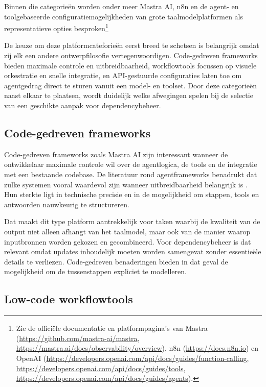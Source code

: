 Binnen die categorieën worden onder meer Mastra AI, n8n en de agent- en toolgebaseerde configuratiemogelijkheden van grote taalmodelplatformen als representatieve opties besproken\footnote{Zie de officiële documentatie en platformpagina's van Mastra (\url{https://github.com/mastra-ai/mastra}, \url{https://mastra.ai/docs/observability/overview}), n8n (\url{https://docs.n8n.io}) en OpenAI (\url{https://developers.openai.com/api/docs/guides/function-calling}, \url{https://developers.openai.com/api/docs/guides/tools}, \url{https://developers.openai.com/api/docs/guides/agents}).}

De keuze om deze platformcateforieën eerst breed te schetsen is belangrijk omdat zij elk een andere ontwerpfilosofie vertegenwoordigen. Code-gedreven frameworks bieden maximale controle en uitbreidbaarheid, workflowtools focussen op visuele orkestratie en snelle integratie, en API-gestuurde configuraties laten toe om agentgedrag direct te sturen vanuit een model- en toolset. Door deze categorieën naast elkaar te plaatsen, wordt duidelijk welke afwegingen spelen bij de selectie van een geschikte aanpak voor dependencybeheer.

\subsection{Code-gedreven frameworks}

Code-gedreven frameworks zoals Mastra AI zijn interessant wanneer de ontwikkelaar maximale controle wil over de agentlogica, de tools en de integratie met een bestaande codebase. De literatuur rond agentframeworks benadrukt dat zulke systemen vooral waardevol zijn wanneer uitbreidbaarheid belangrijk is \textcite{MastraGithub,MastraTutorial,MastraObservability}. Hun sterkte ligt in technische precisie en in de mogelijkheid om stappen, tools en antwoorden nauwkeurig te structureren.

Dat maakt dit type platform aantrekkelijk voor taken waarbij de kwaliteit van de output niet alleen afhangt van het taalmodel, maar ook van de manier waarop inputbronnen worden gekozen en gecombineerd. Voor dependencybeheer is dat relevant omdat updates inhoudelijk moeten worden samengevat zonder essentieële details te verliezen. Code-gedreven benaderingen bieden in dat geval de mogelijkheid om de tussenstappen expliciet te modelleren.

\subsection{Low-code workflowtools}


